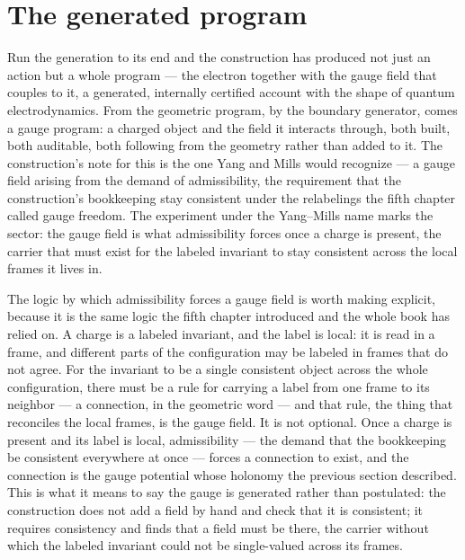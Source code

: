 \section{The generated program}
\label{se:the-generated-program}

Run the generation to its end and the construction has produced not just an action but a whole program
--- the electron together with the gauge field that couples to it, a generated, internally certified
account with the shape of quantum electrodynamics. From the geometric program, by the boundary
generator, comes a gauge program: a charged object and the field it interacts through, both built, both
auditable, both following from the geometry rather than added to it. The construction's note for this is
the one Yang and Mills would recognize --- a gauge field arising from the demand of admissibility, the
requirement that the construction's bookkeeping stay consistent under the relabelings the fifth chapter
called gauge freedom. The experiment under the Yang--Mills name marks the sector: the gauge field is what
admissibility forces once a charge is present, the carrier that must exist for the labeled invariant to
stay consistent across the local frames it lives in.

The logic by which admissibility forces a gauge field is worth making explicit, because it is the same
logic the fifth chapter introduced and the whole book has relied on. A charge is a labeled invariant,
and the label is local: it is read in a frame, and different parts of the configuration may be labeled in
frames that do not agree. For the invariant to be a single consistent object across the whole
configuration, there must be a rule for carrying a label from one frame to its neighbor --- a connection,
in the geometric word --- and that rule, the thing that reconciles the local frames, is the gauge field.
It is not optional. Once a charge is present and its label is local, admissibility --- the demand that
the bookkeeping be consistent everywhere at once --- forces a connection to exist, and the connection is
the gauge potential whose holonomy the previous section described. This is what it means to say the
gauge is generated rather than postulated: the construction does not add a field by hand and check that
it is consistent; it requires consistency and finds that a field must be there, the carrier without
which the labeled invariant could not be single-valued across its frames.

